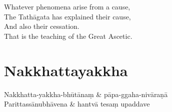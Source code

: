 \begin{english}
  Whatever phenomena arise from a cause,\\
  The Tathāgata has explained their cause,\\
  And also their cessation.\\
  That is the teaching of the Great Ascetic.
\end{english}


\section{Nakkhattayakkha}



\begin{twochants}
  Nakkhatta-yakkha-bhūtānaṃ & pāpa-ggaha-nivāraṇā\\
  Parittassānubhāvena & hantvā tesaṃ upaddave\\
\end{twochants}



